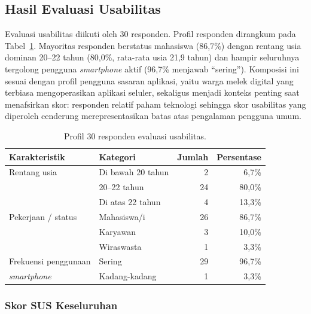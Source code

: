 \subsection{Hasil Evaluasi Usabilitas}
\label{sec:hasil-usabilitas}

Evaluasi usabilitas diikuti oleh 30 responden. Profil responden dirangkum pada Tabel~\ref{tab:profil-responden}. Mayoritas responden berstatus mahasiswa (86,7\%) dengan rentang usia dominan 20--22 tahun (80,0\%, rata-rata usia 21,9 tahun) dan hampir seluruhnya tergolong pengguna \textit{smartphone} aktif (96,7\% menjawab ``sering''). Komposisi ini sesuai dengan profil pengguna sasaran aplikasi, yaitu warga melek digital yang terbiasa mengoperasikan aplikasi seluler, sekaligus menjadi konteks penting saat menafsirkan skor: responden relatif paham teknologi sehingga skor usabilitas yang diperoleh cenderung merepresentasikan batas atas pengalaman pengguna umum.

\begin{table}[htbp]
\centering
\small
\caption{Profil 30 responden evaluasi usabilitas.}
\label{tab:profil-responden}
\begin{tabular}{p{4.2cm} p{5cm} r r}
\toprule
\textbf{Karakteristik} & \textbf{Kategori} & \textbf{Jumlah} & \textbf{Persentase} \\
\midrule
Rentang usia & Di bawah 20 tahun & 2 & 6,7\% \\
             & 20--22 tahun & 24 & 80,0\% \\
             & Di atas 22 tahun & 4 & 13,3\% \\
\addlinespace
Pekerjaan / status & Mahasiswa/i & 26 & 86,7\% \\
                   & Karyawan & 3 & 10,0\% \\
                   & Wiraswasta & 1 & 3,3\% \\
\addlinespace
Frekuensi penggunaan & Sering & 29 & 96,7\% \\
\textit{smartphone}  & Kadang-kadang & 1 & 3,3\% \\
\bottomrule
\end{tabular}
\end{table}

\subsubsection{Skor SUS Keseluruhan}

